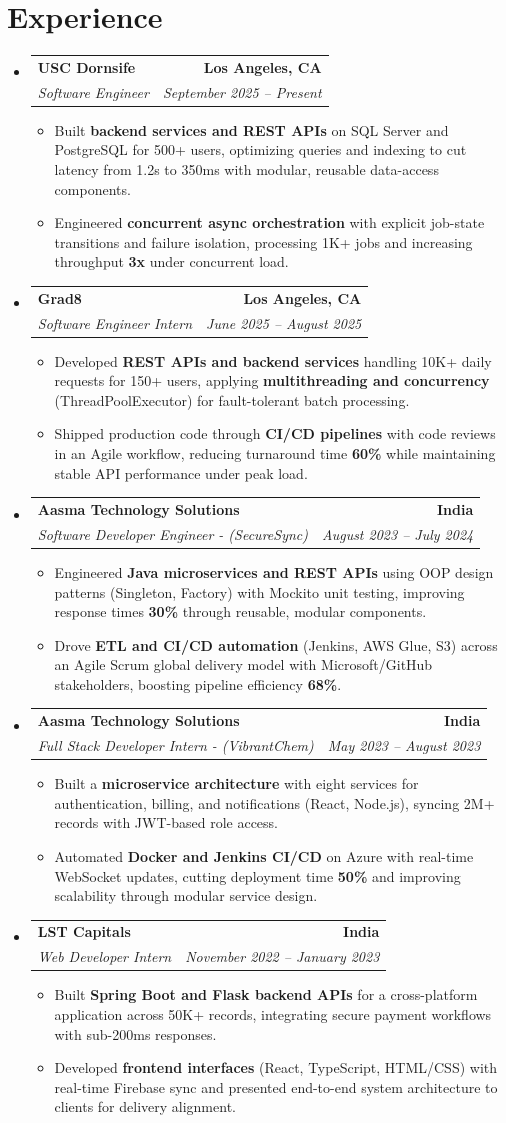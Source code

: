 \documentclass[letterpaper,10pt]{article}
\makeatletter
\newcommand{\resumeItem}[1]{\item\small{{#1 \vspace{-2pt}}}}
\newcommand{\resumeSubheading}[4]{\vspace{-1pt}\item\begin{tabular*}{1.0\textwidth}[t]{l@{\extracolsep{\fill}}r}\textbf{#1} & \textbf{\small #2} \\\textit{\small#3} & \textit{\small #4} \\\end{tabular*}\vspace{-2pt}}
\newcommand{\resumeSubHeadingListStart}{\begin{itemize}[leftmargin=0.0in, label={}]}
\newcommand{\resumeSubHeadingListEnd}{\end{itemize}}
\newcommand{\resumeItemListStart}{\begin{itemize}[leftmargin=0.15in,label=\textbullet,itemsep=2pt,topsep=0pt,parsep=0pt,partopsep=0pt]}
\newcommand{\resumeItemListEnd}{\end{itemize}\vspace{-4pt}}
\makeatother
\begin{document}
\section{Experience}
\resumeSubHeadingListStart
\resumeSubheading{USC Dornsife}{Los Angeles, CA}{Software Engineer}{September 2025 -- Present}
\resumeItemListStart
\resumeItem{Built \textbf{backend services and REST APIs} on SQL Server and PostgreSQL for 500+ users, optimizing queries and indexing to cut latency from 1.2s to 350ms with modular, reusable data-access components.}
\resumeItem{Engineered \textbf{concurrent async orchestration} with explicit job-state transitions and failure isolation, processing 1K+ jobs and increasing throughput \textbf{3x} under concurrent load.}
\resumeItemListEnd
\resumeSubheading{Grad8}{Los Angeles, CA}{Software Engineer Intern}{June 2025 -- August 2025}
\resumeItemListStart
\resumeItem{Developed \textbf{REST APIs and backend services} handling 10K+ daily requests for 150+ users, applying \textbf{multithreading and concurrency} (ThreadPoolExecutor) for fault-tolerant batch processing.}
\resumeItem{Shipped production code through \textbf{CI/CD pipelines} with code reviews in an Agile workflow, reducing turnaround time \textbf{60\%} while maintaining stable API performance under peak load.}
\resumeItemListEnd
\resumeSubheading{Aasma Technology Solutions}{India}{Software Developer Engineer - (SecureSync)}{August 2023 -- July 2024}
\resumeItemListStart
\resumeItem{Engineered \textbf{Java microservices and REST APIs} using OOP design patterns (Singleton, Factory) with Mockito unit testing, improving response times \textbf{30\%} through reusable, modular components.}
\resumeItem{Drove \textbf{ETL and CI/CD automation} (Jenkins, AWS Glue, S3) across an Agile Scrum global delivery model with Microsoft/GitHub stakeholders, boosting pipeline efficiency \textbf{68\%}.}
\resumeItemListEnd
\resumeSubheading{Aasma Technology Solutions}{India}{Full Stack Developer Intern - (VibrantChem)}{May 2023 -- August 2023}
\resumeItemListStart
\resumeItem{Built a \textbf{microservice architecture} with eight services for authentication, billing, and notifications (React, Node.js), syncing 2M+ records with JWT-based role access.}
\resumeItem{Automated \textbf{Docker and Jenkins CI/CD} on Azure with real-time WebSocket updates, cutting deployment time \textbf{50\%} and improving scalability through modular service design.}
\resumeItemListEnd
\resumeSubheading{LST Capitals}{India}{Web Developer Intern}{November 2022 -- January 2023}
\resumeItemListStart
\resumeItem{Built \textbf{Spring Boot and Flask backend APIs} for a cross-platform application across 50K+ records, integrating secure payment workflows with sub-200ms responses.}
\resumeItem{Developed \textbf{frontend interfaces} (React, TypeScript, HTML/CSS) with real-time Firebase sync and presented end-to-end system architecture to clients for delivery alignment.}
\resumeItemListEnd
\resumeSubHeadingListEnd
\vspace{-6pt}
\end{document}
